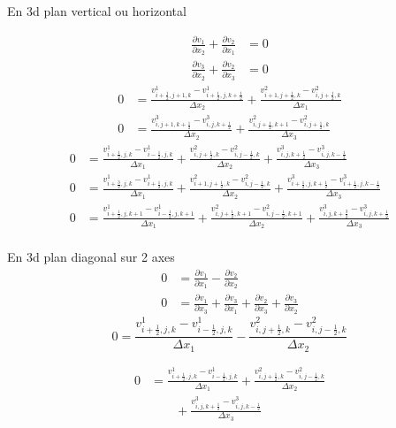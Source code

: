 \begin{frame}[shrink]{En 3d plan vertical ou horizontal}
 
\begin{align*}
	\frac{\partial v_{1}}{\partial x_{2}}+\frac{\partial v_{2}}{\partial x_{1}}&=0\\
	\frac{\partial v_{3}}{\partial x_{2}}+\frac{\partial v_{2}}{\partial x_{3}}&=0
\end{align*}
\begin{align*}
	0&=\frac{v^{1}_{i+\frac{1}{2},j+1,k}-v^{1}_{i+\frac{1}{2},j,k+\frac{1}{2}}}{\Delta x_{2}}+\frac{v^{2}_{i+1,j+\frac{1}{2},k}-v^{2}_{i,j+\frac{1}{2},k}}{\Delta x_{1}}\\
	0&=\frac{v^{3}_{i,j+1,k+\frac{1}{2}}-v^{3}_{i,j,k+\frac{1}{2}}}{\Delta x_{2}}+\frac{v^{2}_{i,j+\frac{1}{2},k+1}-v^{2}_{i,j+\frac{1}{2},k}}{\Delta x_{3}}
\end{align*}
\begin{align*}
	0&=\frac{v^{1}_{i+\frac{1}{2},j,k}-v^{1}_{i-\frac{1}{2},j,k}}{\Delta x_{1}}+\frac{v^{2}_{i,j+\frac{1}{2},k}-v^{2}_{i,j-\frac{1}{2},k}}{\Delta x_2} +\frac{v^{3}_{i,j,k+\frac{1}{2}}-v^{3}_{i,j,k-\frac{1}{2}}}{\Delta x_{3}}\\
 	0&=\frac{v^{1}_{i+\frac{3}{2},j,k}-v^{1}_{i+\frac{1}{2},j,k}}{\Delta x_{1}}+\frac{v^{2}_{i+1,j+\frac{1}{2},k}-v^{2}_{i,j-\frac{1}{2},k}}{\Delta x_2}+\frac{v^{3}_{i+\frac{1}{2},j,k+\frac{1}{2}}-v^{3}_{i+\frac{1}{2},j,k-\frac{1}{2}}}{\Delta x_{3}}\\
 	0&=\frac{v^{1}_{i+\frac{1}{2},j,k+1}-v^{1}_{i-\frac{1}{2},j,k+1}}{\Delta x_{1}}+\frac{v^{2}_{i,j+\frac{1}{2},k+1}-v^{2}_{i,j-\frac{1}{2},k+1}}{\Delta x_2}+\frac{v^{3}_{i,j,k+\frac{3}{2}}-v^{3}_{i,j,k+\frac{1}{2}}}{\Delta x_{3}}\\
\end{align*}
\vspace{2cm}
\end{frame}

\begin{frame}[shrink]{En 3d plan diagonal sur 2 axes}
\begin{align*}
	0&=\frac{\partial v_{1}}{\partial x_{1}}-\frac{\partial v_{2}}{\partial x_{2}}\\
	0&=\frac{\partial v_{1}}{\partial x_{3}}+\frac{\partial v_{3}}{\partial x_{1}}+\frac{\partial v_{2}}{\partial x_{3}}+\frac{\partial v_{3}}{\partial x_{2}}
\end{align*}
\begin{equation*}
	0=\frac{v^{1}_{i+\frac{1}{2},j,k}-v^{1}_{i-\frac{1}{2},j,k}}{\Delta x_{1}}-\frac{v^{2}_{i,j+\frac{1}{2},k}-v^{2}_{i,j-\frac{1}{2},k}}{\Delta x_{2}}
\end{equation*}

\begin{align*}
	0&=\frac{v^{1}_{i+\frac{1}{2},j,k}-v^{1}_{i-\frac{1}{2},j,k}}{\Delta x_{1}}+\frac{v^{2}_{i,j+\frac{1}{2},k}-v^{2}_{i,j-\frac{1}{2},k}}{\Delta x_2}\\
	&\qquad+\frac{v^{3}_{i,j,k+\frac{1}{2}}-v^{3}_{i,j,k-\frac{1}{2}}}{\Delta x_{3}}
\end{align*}
\end{frame}

